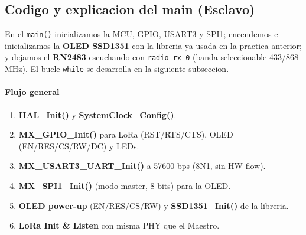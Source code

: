 \documentclass[a4paper,12pt]{article}
\begin{document}
\subsection{Codigo y explicacion del main (Esclavo)}

En el \texttt{main()} inicializamos la MCU, GPIO, USART3 y SPI1; encendemos e inicializamos la \textbf{OLED SSD1351} con la libreria ya usada en la practica anterior; y dejamos el \textbf{RN2483} escuchando con \texttt{radio rx 0} (banda seleccionable 433/868 MHz). El bucle \texttt{while} se desarrolla en la siguiente subseccion.

\paragraph{Flujo general}
\begin{enumerate}
  \item \textbf{HAL\_Init()} y \textbf{SystemClock\_Config()}.
  \item \textbf{MX\_GPIO\_Init()} para LoRa (RST/RTS/CTS), OLED (EN/RES/CS/RW/DC) y LEDs.
  \item \textbf{MX\_USART3\_UART\_Init()} a 57600 bps (8N1, sin HW flow).
  \item \textbf{MX\_SPI1\_Init()} (modo master, 8 bits) para la OLED.
  \item \textbf{OLED power-up} (EN/RES/CS/RW) y \textbf{SSD1351\_Init()} de la libreria.
  \item \textbf{LoRa Init \& Listen} con misma PHY que el Maestro.
\end{enumerate}
\end{document}

